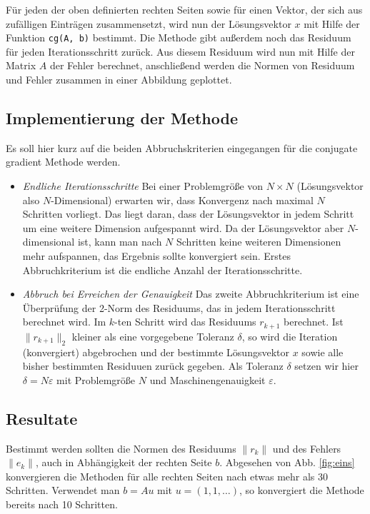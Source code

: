 \documentclass[10pt,a4paper]{article}
\begin{document}
Für jeden der oben definierten rechten Seiten sowie für einen Vektor, der sich
aus zufälligen Einträgen zusammensetzt, wird nun der Lösungsvektor $x$ mit Hilfe
der Funktion \texttt{cg(A, b)} bestimmt. Die Methode gibt außerdem noch das
Residuum für jeden Iterationsschritt zurück.
Aus diesem Residuum wird nun mit Hilfe der Matrix $A$ der Fehler berechnet,
anschließend werden die Normen von Residuum und Fehler zusammen in einer
Abbildung geplottet.

\subsection{Implementierung der Methode}

Es soll hier kurz auf die beiden Abbruchskriterien eingegangen für die conjugate
gradient Methode werden.
\begin{itemize}
\item \emph{Endliche Iterationsschritte} \qquad
  Bei einer Problemgröße von $N\times N$ (Lösungsvektor also $N$-Dimensional)
  erwarten wir, dass Konvergenz nach 
  maximal $N$ Schritten vorliegt. Das liegt daran, dass der Lösungsvektor in jedem
  Schritt um eine weitere Dimension aufgespannt wird. Da der Lösungsvektor aber
  $N$-dimensional ist, kann man nach $N$ Schritten keine weiteren Dimensionen mehr
  aufspannen, das Ergebnis sollte konvergiert sein. Erstes Abbruchkriterium ist
  die endliche Anzahl der Iterationsschritte.
\item \emph{Abbruch bei Erreichen der Genauigkeit} \qquad
  Das zweite Abbruchkriterium ist eine Überprüfung der 2-Norm des Residuums, das
  in jedem Iterationsschritt berechnet wird. Im $k$-ten Schritt wird das Residuums
  $r_{k+1}$ berechnet. Ist $\|r_{k+1}\|_{2}$ kleiner als eine vorgegebene
  Toleranz $\delta$, so wird die Iteration (konvergiert) abgebrochen und der bestimmte
  Lösungsvektor $x$ sowie alle bisher bestimmten Residuuen zurück gegeben.
  Als Toleranz $\delta$ setzen wir hier $\delta = N \varepsilon$ mit Problemgröße
  $N$ und Maschinengenauigkeit $\varepsilon$.
\end{itemize}

\subsection{Resultate}

Bestimmt werden sollten die Normen des Residuums $\| r_{k} \|$ und des Fehlers
$\| e_{k} \|$, auch in Abhängigkeit der rechten Seite $b$. Abgesehen von Abb.
\ref{fig:eins} konvergieren die Methoden für alle rechten Seiten nach etwas mehr
als \num{30} Schritten. Verwendet man $b = Au$ mit $u = (1, 1, \dots)$, so
konvergiert die Methode bereits nach \num{10} Schritten.
\end{document}
